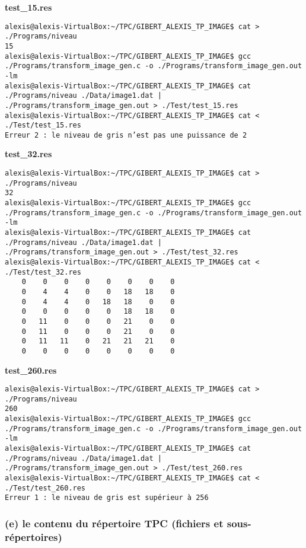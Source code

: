 \documentclass[11pt]{article}
\begin{document}
\textbf{test\_15.res}

\begin{verbatim}
alexis@alexis-VirtualBox:~/TPC/GIBERT_ALEXIS_TP_IMAGE$ cat > ./Programs/niveau
15
alexis@alexis-VirtualBox:~/TPC/GIBERT_ALEXIS_TP_IMAGE$ gcc ./Programs/transform_image_gen.c -o ./Programs/transform_image_gen.out -lm
alexis@alexis-VirtualBox:~/TPC/GIBERT_ALEXIS_TP_IMAGE$ cat ./Programs/niveau ./Data/image1.dat | ./Programs/transform_image_gen.out > ./Test/test_15.res
alexis@alexis-VirtualBox:~/TPC/GIBERT_ALEXIS_TP_IMAGE$ cat < ./Test/test_15.res 
Erreur 2 : le niveau de gris n’est pas une puissance de 2
\end{verbatim}

\textbf{test\_32.res}

\begin{verbatim}
alexis@alexis-VirtualBox:~/TPC/GIBERT_ALEXIS_TP_IMAGE$ cat > ./Programs/niveau
32
alexis@alexis-VirtualBox:~/TPC/GIBERT_ALEXIS_TP_IMAGE$ gcc ./Programs/transform_image_gen.c -o ./Programs/transform_image_gen.out -lm
alexis@alexis-VirtualBox:~/TPC/GIBERT_ALEXIS_TP_IMAGE$ cat ./Programs/niveau ./Data/image1.dat | ./Programs/transform_image_gen.out > ./Test/test_32.res
alexis@alexis-VirtualBox:~/TPC/GIBERT_ALEXIS_TP_IMAGE$ cat < ./Test/test_32.res 
    0    0    0    0    0    0    0    0
    0    4    4    0    0   18   18    0
    0    4    4    0   18   18    0    0
    0    0    0    0    0   18   18    0
    0   11    0    0    0   21    0    0
    0   11    0    0    0   21    0    0
    0   11   11    0   21   21   21    0
    0    0    0    0    0    0    0    0
\end{verbatim}

\textbf{test\_260.res}

\begin{verbatim}
alexis@alexis-VirtualBox:~/TPC/GIBERT_ALEXIS_TP_IMAGE$ cat > ./Programs/niveau
260
alexis@alexis-VirtualBox:~/TPC/GIBERT_ALEXIS_TP_IMAGE$ gcc ./Programs/transform_image_gen.c -o ./Programs/transform_image_gen.out -lm
alexis@alexis-VirtualBox:~/TPC/GIBERT_ALEXIS_TP_IMAGE$ cat ./Programs/niveau ./Data/image1.dat | ./Programs/transform_image_gen.out > ./Test/test_260.res
alexis@alexis-VirtualBox:~/TPC/GIBERT_ALEXIS_TP_IMAGE$ cat < ./Test/test_260.res
Erreur 1 : le niveau de gris est supérieur à 256
\end{verbatim}

\subsubsection{(e) le contenu du répertoire TPC (fichiers et
sous-répertoires)}\label{e-le-contenu-du-ruxe9pertoire-tpc-fichiers-et-sous-ruxe9pertoires}
\end{document}
